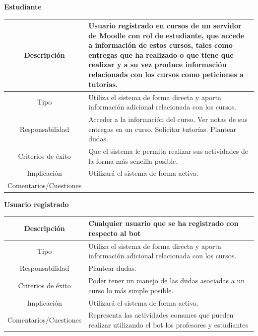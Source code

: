 \textbf{Estudiante}

\begin{table}[H]
\begin{tabular}{|c|p{10cm}|}
\hline
{ Descripción } & {Usuario registrado en cursos de un servidor de Moodle con rol de estudiante, que accede a información de estos cursos, tales como entregas que ha realizado o que tiene que realizar y a su vez produce información relacionada con los cursos como peticiones a tutorías. }\\
\hline 
{ Tipo } & { Utiliza el sistema de forma directa y aporta información  adicional relacionada con los cursos.}  \\
\hline
{ Responsabilidad } & { Acceder a la información del curso.
Ver notas de sus entregas en un curso.
Solicitar tutorías.
Plantear dudas.
}  \\
\hline
{ Criterios de éxito }& { Que el sistema le permita realizar sus actividades de la forma más sencilla posible.}\\
\hline
{ Implicación }& { Utilizará el sistema de forma activa.} \\
\hline
{ Comentarios/Cuestiones }& { } \\
\hline

\end{tabular}
\end{table}

\textbf{Usuario registrado}

\begin{table}[H]
\begin{tabular}{|c|p{10cm}|}
\hline
{ Descripción } & {Cualquier usuario que se ha registrado con respecto al bot  }\\
\hline 
{ Tipo } & { Utiliza el sistema de forma directa y aporta información  adicional relacionada con los cursos.}  \\
\hline
{ Responsabilidad } & {
Plantear dudas.
}  \\
\hline
{ Criterios de éxito }& { Poder tener un manejo de las dudas asociadas a un curso lo más simple posible.}\\
\hline
{ Implicación }& { Utilizará el sistema de forma activa.} \\
\hline
{ Comentarios/Cuestiones }& { Representa las actividades comunes que pueden realizar utilizando el bot los profesores y estudiantes} \\
\hline

\end{tabular}
\end{table}

